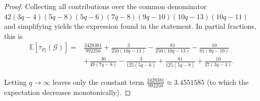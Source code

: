 \documentclass{article}
\newtheorem{lemma}{Lemma}
\newcommand{\PG}{\mathrm{PG}}
\newcommand{\Gscr}{\mathscr{G}}
\newcommand{\E}{\mathbb{E}}
\begin{document}
\begin{proof}
Collecting all contributions over the common denominator
$42(3q-4)(5q-8)(5q-6)(7q-8)(9q-10)(10q-13)(10q-11)$ and simplifying yields
the expression found in the statement. In partial fractions, this is
\begin{align*}
\E[\tau_{P_i}(\Gscr)]
=&\frac{3428381}{992250}
+\frac{3}{250(10q-11)}
-\frac{81}{250(10q-13)}
-\frac{10}{81(9q-10)}\\
&+\frac{30}{49(7q-8)}
-\frac{3}{125(5q-6)}
+\frac{81}{125(5q-8)}
+\frac{10}{27(3q-4)} .
\end{align*}


Letting
$q\to\infty$ leaves only the constant term $\tfrac{3428381}{992250}\approx 3.4551585$ (to which the
expectation decreases monotonically). 
\end{proof}





\end{document}
